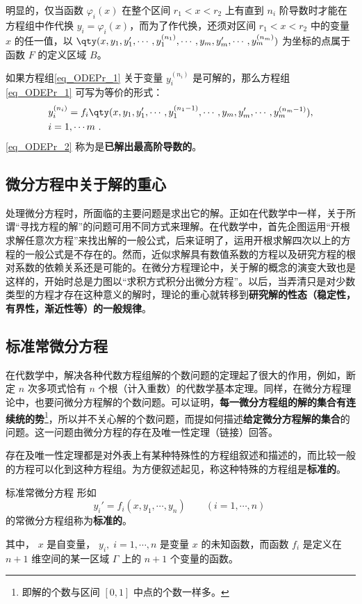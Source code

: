 明显的，仅当函数 $\varphi_i(x)$ 在整个区间 $r_1<x<r_2$ 上有直到 $n_i$ 阶导数时才能在方程组中作代换 $y_i=\varphi_i(x)$，而为了作代换，还须对区间 $r_1<x<r_2$ 中的变量 $x$ 的任一值，以 $\qty(x,y_1,y_1',\cdots,y_1^{(n_1)},\cdots,y_m,y_m',\cdots,y_m^{(n_m)})$ 为坐标的点属于函数 $F$ 的定义区域 $B$。

如果方程组\autoref{eq_ODEPr_1} 关于变量 $y_i^{(n_i)}$ 是可解的，那么方程组\autoref{eq_ODEPr_1} 可写为等价的形式： 
\begin{equation}\label{eq_ODEPr_2}
\begin{aligned}
&y_i^{(n_i)}=f_i\qty(x,y_1,y_1',\cdots,y_1^{(n_1-1)},\cdots,y_m,y_m',\cdots,y_m^{(n_m-1)}),\\
& i=1,\cdots m~.
\end{aligned}
\end{equation}
\autoref{eq_ODEPr_2} 称为是\textbf{已解出最高阶导数的}。
\subsection{微分方程中关于解的重心}
处理微分方程时，所面临的主要问题是求出它的解。正如在代数学中一样，关于所谓“寻找方程的解”的问题可用不同方式来理解。在代数学中，首先企图运用“开根求解任意次方程”来找出解的一般公式，后来证明了，运用开根求解四次以上的方程的一般公式是不存在的。然而，近似求解具有数值系数的方程以及研究方程的根对系数的依赖关系还是可能的。在微分方程理论中，关于解的概念的演变大致也是这样的，开始时总是力图以“求积方式积分出微分方程”。以后，当弄清只是对少数类型的方程才存在这种意义的解时，理论的重心就转移到\textbf{研究解的性态（稳定性，有界性，渐近性等）的一般规律}。
\subsection{标准常微分方程}\label{sub_ODEPr_1}
在代数学中，解决各种代数方程组解的个数问题的定理起了很大的作用，例如，断定 $n$ 次多项式恰有 $n$ 个根（计入重数）的代数学基本定理。同样，在微分方程理论中，也要问微分方程解的个数问题。可以证明，\textbf{每一微分方程组的解的集合有连续统的势}\footnote{即解的个数与区间 $[0,1]$ 中点的个数一样多。}，所以并不关心解的个数问题，而提如何描述\textbf{给定微分方程解的集合}的问题。这一问题由微分方程的存在及唯一性定理（链接）回答。

存在及唯一性定理都是对外表上有某种特殊性的方程组叙述和描述的，而比较一般的方程可以化到这种方程组。为方便叙述起见，称这种特殊的方程组是\textbf{标准的}。

\begin{definition}{标准常微分方程}\label{def_ODEPr_1}
形如
\begin{equation}
y_i'=f_i(x,y_1,\cdots,y_n)\qquad (i=1,\cdots,n)~
\end{equation}
的常微分方程组称为\textbf{标准的}。

其中， $x$ 是自变量， $y_i,\; i=1,\cdots, n$ 是变量 $x$ 的未知函数，而函数 $f_i$ 是定义在 $n+1$ 维空间的某一区域 $\Gamma$ 上的 $n+1$ 个变量的函数。
\end{definition}

